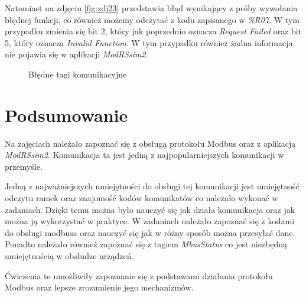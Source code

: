 \documentclass{article}
\begin{document}
Natomiast na zdjęciu \ref{fig:zdj23} przedstawia błąd wynikający z próby wywołania błędnej funkcji, co również możemy odczytać z kodu zapisanego w \textit{\%R07}. W tym przypadku zmienia się bit 2, który jak poprzednio oznacza \textit{Request Failed} oraz bit 5, który oznacza \textit{Invalid Function}. W tym przypadku również żadna informacja nie pojawia się w aplikacji \textit{ModRSsim2}.



\begin{figure}[!ht]
    \centering
    \caption{Błędne tagi komunikacyjne}
    \label{fig:main2}
\end{figure}
\newpage
\section{Podsumowanie}
Na zajęciach należało zapoznać się z obsługą protokołu Modbus oraz z aplikacją \textit{ModRSsim2}. Komunikacja ta jest jedną z najpopularniejszych komunikacji w przemyśle.

Jedną z najważniejszych umiejętności do obsługi tej komunikacji jest umiejętność odczytu ramek oraz znajomość kodów komunikatów co należało wykonać w zadaniach. Dzięki temu można było nauczyć się jak działa komunikacja oraz jak można ją wykorzystać w praktyce. W zadaniach należało zapoznać się z kodami do obsługi modbusa oraz nauczyć się jak w różny sposób można przesyłać dane. Ponadto należało również zapoznać się z tagiem \textit{MbusStatus} co jest niezbędną umiejętnością w obsłudze urządzeń.

Ćwiczenia te umożliwiły zapoznanie się z podstawami działania protokołu Modbus oraz lepsze zrozumienie jego mechanizmów.
\end{document}
